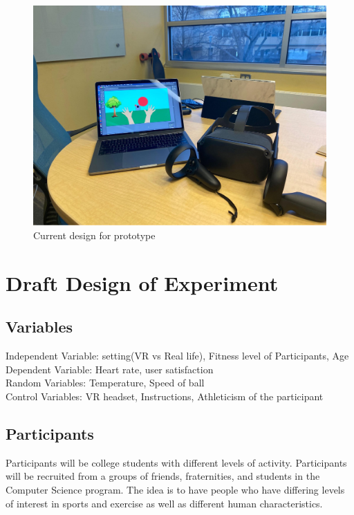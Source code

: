 \documentclass{sigchi}
\begin{document}
\begin{figure}
    \centering
    \includegraphics[scale=0.10]{figures/HCIPrototype.jpg}
    \caption{Current design for prototype}
    \label{fig:my_label}
\end{figure}

\section{Draft Design of Experiment}

\subsection{Variables}
Independent Variable: setting(VR vs Real life), Fitness level of Participants, Age\\
Dependent Variable: Heart rate, user satisfaction\\
Random Variables: Temperature, Speed of ball\\
Control Variables: VR headset, Instructions, Athleticism of the participant

\subsection{Participants}

Participants will be college students with different levels of activity. Participants will be recruited from a groups of friends, fraternities, and students in the Computer Science program. The idea is to have people who have differing levels of interest in sports and exercise as well as different human characteristics. 
\end{document}
